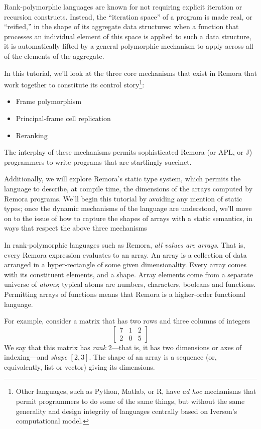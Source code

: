 Rank-polymorphic languages are known for not requiring explicit
iteration or recursion constructs.
Instead, the ``iteration space'' of a program is made real, or ``reified,''
in the shape of its aggregate data structures:
when a function that processes an individual element of this space
is applied to such a data structure,
it is automatically lifted by a general polymorphic mechanism to
apply across all of the elements of the aggregate.

In this tutorial, we'll look at the three core mechanisms that
exist in Remora that work together to constitute its
control story\footnote{Other languages, such as Python, Matlab, or R,
have \emph{ad hoc} mechanisms that permit programmers to do some of
the same things, but without the same generality and design integrity
of languages centrally based on Iverson's computational model.}:
\begin{itemize}
\item Frame polymorphism
\item Principal-frame cell replication
\item Reranking
\end{itemize}
The interplay of these mechanisms permits sophisticated Remora
(or APL, or J) programmers to write programs that are startlingly succinct.

Additionally, we will explore Remora's static type system,
which permits the language to describe, at compile time,
the dimensions of the arrays computed by Remora programs.
We'll begin this tutorial by avoiding any mention of static types;
once the dynamic mechanisms of the language are understood,
we'll move on to the issue of how to capture the shapes of arrays
with a static semantics,
in ways that respect the above three mechanisms 


In rank-polymorphic languages such as Remora,
\emph{all values are arrays}.
That is, every Remora expression evaluates to an array.
An array is a collection of data arranged in a hyper-rectangle of some
given dimensionality.
Every array comes with its constituent elements, and a shape.
Array elements come from a separate universe of \emph{atoms};
typical atoms are numbers, characters, booleans and functions.
Permitting arrays of functions means that Remora is a higher-order
functional language.

For example, consider a matrix that has two rows and three columns of integers
\[
\left[\begin{array}{ccc} 7 & 1 & 2 \\ 2 & 0 & 5\end{array}\right]
\]
We say that this matrix has \emph{rank} 2---that is,
it has two dimensions or axes of indexing---and
\emph{shape} $[2,3]$.
The shape of an array is a sequence (or, equivalently, list or vector)
giving its dimensions.

